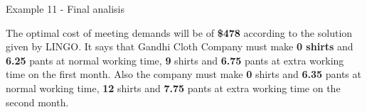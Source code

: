 \begin{frame}{Example 11 - Final analisis}

The optimal cost of meeting demands will be of \textbf{\$478} according to the
solution given by LINGO. It says that Gandhi Cloth Company must make
\textbf{0 shirts} and \textbf{6.25} pants at normal working time, \textbf{9}
shirts and \textbf{6.75} pants at extra working time on the first month. Also
the company must make \textbf{0} shirts and \textbf{6.35} pants at normal
working time, \textbf{12} shirts and \textbf{7.75} pants at extra working time
on the second month.

\end{frame}
